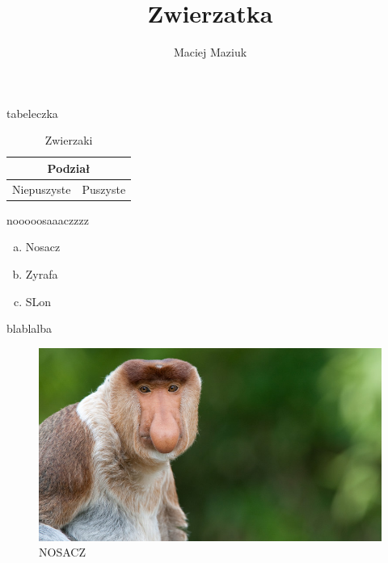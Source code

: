 \documentclass{beamer}
\title{Zwierzatka}
\author{Maciej Maziuk}
\begin{document}
\begin{frame}
\titlepage
\end{frame}

\begin{frame}{tabeleczka}
\begin{table}
\begin{center}
\begin{tabular}{ |p{4cm}|p{4cm}| }
 \hline
 \multicolumn{2}{|c|}{Podział} \\
 \hline
 Niepuszyste &Puszyste\\
\hline
\end{tabular}
\caption{Zwierzaki}
\label{t1}
\end{center}
\end{table}
\end{frame}

\begin{frame}{nooooosaaaczzzz}
\begin{enumerate}[a)]
\item Nosacz
\pause
\item Zyrafa
\pause
\item SLon
\end{enumerate}
\end{frame}

\begin{frame}{blablalba}
\begin{figure}[h!]
\includegraphics[scale=13]{nosacz.jpg}
\caption{NOSACZ \cite{Wiki}}
\label{nosacz}
\end{figure}
\end{frame}
\end{document}
